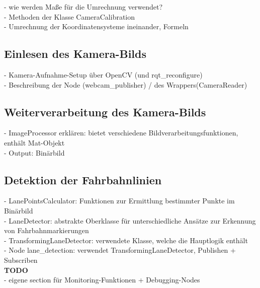 - wie werden Ma\ss e f\"ur die Umrechnung verwendet?\\
- Methoden der Klasse CameraCalibration\\
- Umrechnung der Koordinatensysteme ineinander, Formeln\\

\subsection{Einlesen des Kamera-Bilds}

- Kamera-Aufnahme-Setup \"uber OpenCV (und rqt\_reconfigure)\\
- Beschreibung der Node (webcam\_publisher) / des Wrappers(CameraReader)\\

\subsection{Weiterverarbeitung des Kamera-Bilds}

- ImageProcessor erkl\"aren: bietet verschiedene Bildverarbeitungsfunktionen, enth\"alt Mat-Objekt\\
- Output: Bin\"arbild\\

\subsection{Detektion der Fahrbahnlinien}

- LanePointsCalculator: Funktionen zur Ermittlung bestimmter Punkte im Bin\"arbild\\
- LaneDetector: abstrakte Oberklasse für unterschiedliche Ans\"atze zur Erkennung von Fahrbahnmarkierungen\\
- TransformingLaneDetector: verwendete Klasse, welche die Hauptlogik enth\"alt\\
- Node lane\_detection: verwendet TransformingLaneDetector, Publishen + Subscriben\\


\textbf{TODO}\\
- eigene section für Monitoring-Funktionen + Debugging-Nodes\\